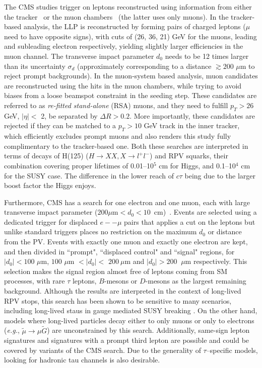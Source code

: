 The CMS studies trigger on leptons reconstructed using information from either the tracker~\cite{CMS:2014hka} or the muon chambers~\cite{CMS:2015pca} (the latter uses only muons).
In the tracker-based analysis, the LLP is reconstructed by forming pairs of charged leptons ($\mu$ need to have opposite signs), with \pT cuts of (26, 36, 21) GeV for the muons, leading and subleading electron respectively, yielding slightly larger efficiencies in the muon channel. The transverse impact parameter $d_0$ needs to be 12 times larger than its uncertainty $\sigma_d$ (approximately corresponding to a distance $\gtrsim200\,\,\mu\mathrm{m}$ to reject prompt backgrounds).  In the muon-system based analysis, muon candidates are reconstructed using the hits in the muon chambers, while trying to avoid biases from a loose beamspot constraint in the seeding step. These candidates are referred to as \emph{re-fitted stand-alone} (RSA) muons, and they need to fulfill $p_T > 26$ GeV,  $|\eta| <$ 2, be separated by $\Delta R > 0.2$. More importantly, these candidates are rejected if they can be matched to a $p_T > 10 $ GeV track in the inner tracker, which efficiently excludes prompt muons and also renders this study fully complimentary to the tracker-based one. Both these searches are interpreted in terms of decays of H(125)  ($H \to XX, X \to l^+ l^-$) and RPV squarks, their combination covering proper lifetimes of 0.01--10$^5$ cm for Higgs, and 0.1--10$^4$ cm for the SUSY case. The difference in the lower reach of $c \tau$ being due to the larger boost factor the Higgs enjoys.

Furthermore, CMS has a search for one electron and one muon, each with large transverse impact parameter ($200 \mu \mathrm{m} < d_{0} <  10$~cm)~\cite{CMS-PAS-EXO-16-022}. Events are selected using a dedicated trigger for displaced $e--\mu$ pairs that  applies a \pT cut on the leptons but unlike standard triggers places no restriction on the maximum $d_{0}$ or distance from the PV. Events with exactly one muon and exactly one electron are kept, and then divided in ``prompt", ``displaced control" and ``signal" regions, for $|d_0| < 100\,\, \mu$m, $100\,\, \mu $m $ < |d_0| < \,\,200~\mu $m and $|d_0| > 200\,\,~\mu $m respectively. This selection makes the signal region almost free of leptons coming from SM processes, with rare $\tau$ leptons, $B$-mesons or $D$-mesons as the largest remaining background. Although the results are interpreted in the context of long-lived RPV stops, this search has been shown to be sensitive to many scenarios, including long-lived staus in gauge mediated SUSY breaking \cite{Evans:2016zau}.   On the other hand, models where long-lived particles decay either to only muons or only to electrons (\emph{e.g.}, $\tilde \mu \to \mu \tilde G$) are unconstrained by this search.  Additionally, same-sign lepton signatures and signatures with a prompt third lepton are possible \cite{Evans:2016zau} and could be covered by variants of the CMS search.  Due to the generality of $\tau$--specific models, looking for hadronic tau channels is also desirable.


